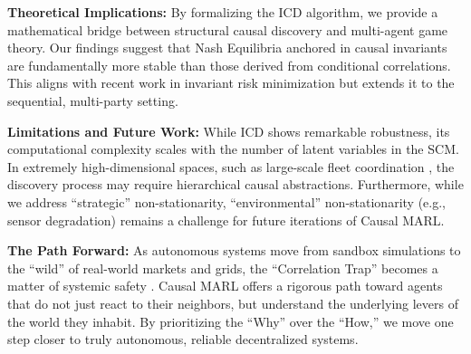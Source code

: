 \textbf{Theoretical Implications:} By formalizing the ICD algorithm, we provide a mathematical bridge between structural causal discovery and multi-agent game theory. Our findings suggest that Nash Equilibria anchored in causal invariants are fundamentally more stable than those derived from conditional correlations. This aligns with recent work in invariant risk minimization \cite{arjovsky2019invariant} but extends it to the sequential, multi-party setting.

\textbf{Limitations and Future Work:} While ICD shows remarkable robustness, its computational complexity scales with the number of latent variables in the SCM. In extremely high-dimensional spaces, such as large-scale fleet coordination \cite{shoham2008multiagent}, the discovery process may require hierarchical causal abstractions. Furthermore, while we address ``strategic'' non-stationarity, ``environmental'' non-stationarity (e.g., sensor degradation) remains a challenge for future iterations of Causal MARL.

\textbf{The Path Forward:} As autonomous systems move from sandbox simulations to the ``wild'' of real-world markets and grids, the ``Correlation Trap'' becomes a matter of systemic safety \cite{ref_new_researchgatenet}. Causal MARL offers a rigorous path toward agents that do not just react to their neighbors, but understand the underlying levers of the world they inhabit. By prioritizing the ``Why'' over the ``How,'' we move one step closer to truly autonomous, reliable decentralized systems.